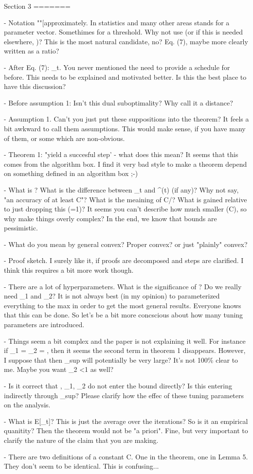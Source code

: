 Section 3
=======

- Notation "\theta"[approximately. In statistics and many other areas \theta stands for a parameter vector. Somethimes for a threshold. Why not use \epsilon (or if this is needed elsewhere, \eta)? This is the most natural candidate, no? Eq. (7), maybe more clearly written as a ratio? 

- After Eq. (7): \sigma_t. You never mentioned the need to provide a schedule for \sigma before. This needs to be explained and motivated better. Is this the best place to have this discussion?

- Before assumption 1: Isn't this dual suboptimality? Why call it a distance? 

- Assumption 1. Can't you just put these suppositions into the theorem? It feels a bit awkward to call them assumptions. This would make sense, if you have many of them, or some which are non-obvious.

- Theorem 1: "yield a succesful step' -  what does this mean? It seems that this comes from the algorithm box. I find it very bad style to make a theorem depend on something defined in an algorithm box ;-)

- What is \epsilon? What is the difference between \epsilon_t and \epsilon^{(t)} (if any)? Why not say, "an accuracy of at least C"? What is the meaining of C/\epsilon? What is gained relative to just dropping this (=1)? It seems you can't describe how much smaller \epsilon (\le C), so why make things overly complex? In the end, we know that bounds are pessimistic.

- What do you mean by general convex? Proper convex? or just "plainly" convex?

- Proof sketch. I surely like it, if proofs are decomposed and steps are clarified. I think this requires a bit more work though.

- There are a lot of hyperparameters. What is the significance of \xi? Do we really need \gamma_1 and \gamma_2? It is not always best (in my opinion) to parameterized everything to the max in order to get the most general results. Everyone knows that this can be done. So let's be a bit more concscious about how many tuning parameters are introduced. 

- Things seem a bit complex and the paper is not explaining it well. For instance if \gamma_1 = \gamma_2 = \gamma, then it seems the second term in theorem 1 disappears. However, I suppose that then \sigma_sup will potentially be very large? It's not 100\% clear to me. Maybe you want \gamma_2 <1 as well? 

- Is it correct that \rho, \zeta_1, \zeta_2 do not enter the bound directly? Is this entering indirectly through \sigma_sup? Please clarify how the effec of these tuning parameters on the analysis. 

- What is E[\sigma_t]? This is just the average over the iterations? So is it an empirical quanitity? Then the theorem would not be "a priori". Fine, but very important to clarify the nature of the claim that you are making.

- There are two definitions of a constant C. One in the theorem, one in Lemma 5. They don't seem to be identical. This is confusing...

